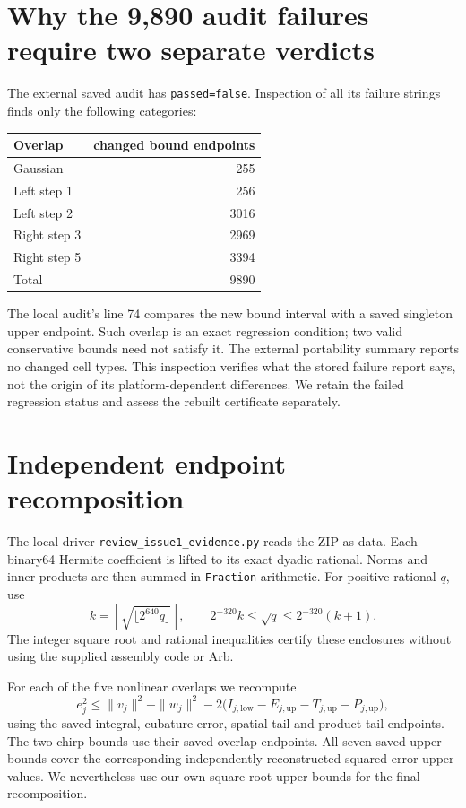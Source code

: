 \documentclass[11pt,a4paper]{article}
\begin{document}
\section{Why the 9,890 audit failures require two separate verdicts}
The external saved audit has \texttt{passed=false}. Inspection of
all its failure strings finds only the following categories:
\begin{center}
\begin{tabular}{lr}\toprule
Overlap & changed bound endpoints\\\midrule
Gaussian &255\\
Left step 1&256\\
Left step 2&3016\\
Right step 3&2969\\
Right step 5&3394\\\midrule
Total&9890\\\bottomrule
\end{tabular}
\end{center}
The local audit's line 74 compares the new bound interval with a
saved singleton upper endpoint. Such overlap is an exact regression
condition; two valid conservative bounds need not satisfy it.
The external portability summary reports no changed cell types.
This inspection verifies what the stored failure report says, not
the origin of its platform-dependent differences. We retain the
failed regression status and assess the rebuilt certificate separately.

\newpage
\section{Independent endpoint recomposition}
The local driver \texttt{review\_issue1\_evidence.py} reads the ZIP
as data. Each binary64 Hermite coefficient is lifted to its exact
dyadic rational. Norms and inner products are then summed in
\texttt{Fraction} arithmetic. For positive rational $q$, use
\begin{equation}
 k=\left\lfloor\sqrt{\lfloor2^{640}q\rfloor}\right\rfloor,
 \qquad 2^{-320}k\leq\sqrt q\leq2^{-320}(k+1).
\end{equation}
The integer square root and rational inequalities certify these
enclosures without using the supplied assembly code or Arb.

For each of the five nonlinear overlaps we recompute
\begin{equation}
 e_j^2\leq\|v_j\|^2+\|w_j\|^2
 -2\big(I_{j,\mathrm{low}}-E_{j,\mathrm{up}}
             -T_{j,\mathrm{up}}-P_{j,\mathrm{up}}\big),
\end{equation}
using the saved integral, cubature-error, spatial-tail and product-tail
endpoints. The two chirp bounds use their saved overlap endpoints.
All seven saved upper bounds cover the corresponding independently
reconstructed squared-error upper values. We nevertheless use our
own square-root upper bounds for the final recomposition.
\end{document}
